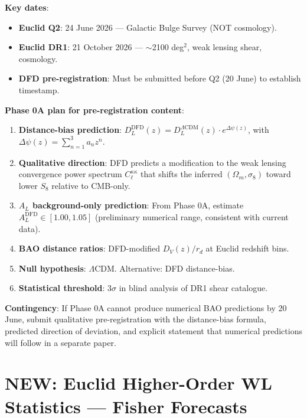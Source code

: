 \documentclass[11pt,a4paper]{article}
\newcommand{\NEW}{\textcolor{dfdblue}{\textbf{NEW}}}
\begin{document}
\begin{tcolorbox}[colback=red!5!white, colframe=red!60!black,
  title={DEADLINE: Euclid Pre-Registration --- 20 June 2026 (88 days)}]

\textbf{Key dates}:
\begin{itemize}
\item \textbf{Euclid Q2}: 24 June 2026 --- Galactic Bulge Survey (NOT cosmology).
\item \textbf{Euclid DR1}: 21 October 2026 --- $\sim$2100 deg$^2$, weak lensing shear, cosmology.
\item \textbf{DFD pre-registration}: Must be submitted before Q2 (20 June) to establish timestamp.
\end{itemize}

\textbf{Phase 0A plan for pre-registration content}:

\begin{enumerate}
\item \textbf{Distance-bias prediction}: $D_L^{\text{DFD}}(z) = D_L^{\Lambda\text{CDM}}(z) \cdot e^{\Delta\psi(z)}$, with $\Delta\psi(z) = \sum_{n=1}^{3} a_n z^n$.
\item \textbf{Qualitative direction}: DFD predicts a modification to the weak lensing convergence power spectrum $C_\ell^{\kappa\kappa}$ that shifts the inferred $(\Omega_m, \sigma_8)$ toward lower $S_8$ relative to CMB-only.
\item \textbf{$A_L$ background-only prediction}: From Phase 0A, estimate $A_L^{\text{DFD}} \in [1.00, 1.05]$ (preliminary numerical range, consistent with current data).
\item \textbf{BAO distance ratios}: DFD-modified $D_V(z)/r_d$ at Euclid redshift bins.
\item \textbf{Null hypothesis}: $\Lambda$CDM. Alternative: DFD distance-bias.
\item \textbf{Statistical threshold}: $3\sigma$ in blind analysis of DR1 shear catalogue.
\end{enumerate}

\textbf{Contingency}: If Phase 0A cannot produce numerical BAO predictions by 20 June, submit qualitative pre-registration with the distance-bias formula, predicted direction of deviation, and explicit statement that numerical predictions will follow in a separate paper.
\end{tcolorbox}

\section{\NEW: Euclid Higher-Order WL Statistics --- Fisher Forecasts}
\end{document}
